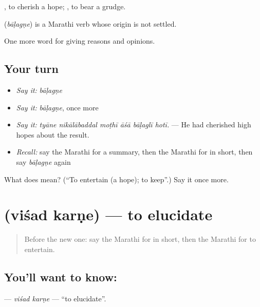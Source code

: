  , to cherish a hope;  , to bear a grudge.

\begin{cousinweb}
\textbf{} (\emph{bāḷagṇe}) is a Marathi verb whose origin is not settled.
\end{cousinweb}

\begin{grammarlens}[title={What you've built}]
One more word for giving reasons and opinions.
\end{grammarlens}

\subsection*{Your turn}
\begin{itemize}
\raggedright
  \item \emph{Say it:} \emph{bāḷagṇe}
  \item \emph{Say it:} \emph{bāḷagṇe}, once more
  \item \emph{Say it:} \emph{tyāne nikālābaddal moṭhī āśā bāḷaglī hotī.} — He had cherished high hopes about the result.
  \item \emph{Recall:} say the Marathi for a summary, then the Marathi for in short, then say \emph{bāḷagṇe} again
\end{itemize}

\begin{tcolorbox}[breakable,colback=teal!4,colframe=teal!35!black,title={Before you move on}]
What does  mean? (\textquotedblleft{}To entertain (a hope); to keep\textquotedblright{}.) Say it once more.
\end{tcolorbox}
\section[\texorpdfstring{\mr{विशद} \mr{करणे} (viśad karṇe)}{विशद करणे (viśad karṇe)}]{  (viśad karṇe) — to elucidate}

\label{lesson:MR-C346-visad-karne}



\begin{quote}
Before the new one: say the Marathi for in short, then the Marathi for to entertain.
\end{quote}

\subsection*{You'll want to know:  }
\textbf{ } — \emph{viśad karṇe} — \textquotedblleft{}to elucidate\textquotedblright{}.

